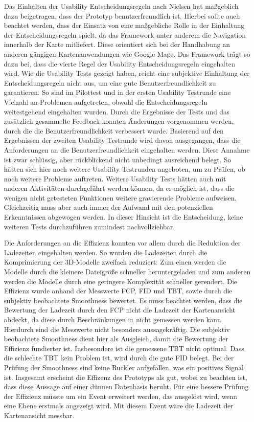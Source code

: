 Das Einhalten der Usability Entscheidungsregeln nach Nielsen \cite{Nielsen.1994} hat maßgeblich dazu beigetragen, dass der Prototyp benutzerfreundlich ist. Hierbei sollte auch beachtet werden, dass der Einsatz von \deckgl{} eine maßgebliche Rolle in der Einhaltung der Entscheidungsregeln spielt, da das Framework unter anderem die Navigation innerhalb der Karte mitliefert. Diese orientiert sich bei der Handhabung an anderen gängigen Kartenanwendungen wie Google Maps. Das Framework trägt so dazu bei, dass die vierte Regel der Usability Entscheidungsregeln \cite[Regel 4]{Nielsen.1994} eingehalten wird. Wie die Usability Tests gezeigt haben, reicht eine subjektive Einhaltung der Entscheidungsregeln nicht aus, um eine gute Benutzerfreundlichkeit zu garantieren. So sind im Pilottest und in der ersten Usability Testrunde eine Vielzahl an Problemen aufgetreten, obwohl die Entscheidungsregeln weitestgehend eingehalten wurden. Durch die Ergebnisse der Tests und das zusätzlich gesammelte Feedback konnten Änderungen vorgenommen werden, durch die die Benutzerfreundlichkeit verbessert wurde. Basierend auf den Ergebnissen der zweiten Usability Testrunde wird davon ausgegangen, dass die Anforderungen an die Benutzerfreundlichkeit eingehalten werden. Diese Annahme ist zwar schlüssig, aber rückblickend nicht unbedingt ausreichend belegt. So hätten sich hier noch weitere Usability Testrunden angeboten, um zu Prüfen, ob noch weitere Probleme auftreten. Weitere Usability Tests hätten auch mit anderen Aktivitäten durchgeführt werden können, da es möglich ist, dass die wenigen nicht getesteten Funktionen weitere gravierende Probleme aufweisen. Gleichzeitig muss aber auch immer der Aufwand mit den potenziellen Erkenntnissen abgewogen werden. In dieser Hinsicht ist die Entscheidung, keine weiteren Tests durchzuführen zumindest nachvollziehbar.

Die Anforderungen an die Effizienz konnten vor allem durch die Reduktion der Ladezeiten eingehalten werden. So wurden die Ladezeiten durch die Komprimierung der 3D-Modelle zweifach reduziert: Zum einen werden die Modelle durch die kleinere Dateigröße schneller heruntergeladen und zum anderen werden die Modelle durch eine geringere Komplexität schneller gerendert. Die Effizienz wurde anhand der Messwerte \ac{FCP}, \ac{FID} und \ac{TBT}, sowie durch die subjektiv beobachtete Smoothness bewertet. Es muss beachtet werden, dass die Bewertung der Ladezeit durch den \ac{FCP} nicht die Ladezeit der Kartenansicht abdeckt, da diese durch Beschränkungen in \deckgl{} nicht gemessen werden kann. Hierdurch sind die Messwerte nicht besonders aussagekräftig. Die subjektiv beobachtete Smoothness dient hier als Ausgleich, damit die Bewertung der Effizienz fundierter ist. Insbesondere ist die gemessene \ac{TBT} nicht optimal. Dass die schlechte \ac{TBT} kein Problem ist, wird durch die gute \ac{FID} belegt. Bei der Prüfung der Smoothness sind keine Ruckler aufgefallen, was ein positives Signal ist. Insgesamt erscheint die Effizenz des Prototyps als gut, wobei zu beachten ist, dass diese Aussage auf einer dünnen Datenbasis beruht. Für eine bessere Prüfung der Effizienz müsste \deckgl{} um ein Event erweitert werden, das ausgelöst wird, wenn eine Ebene erstmals angezeigt wird. Mit diesem Event wäre die Ladezeit der Kartenansicht messbar.

